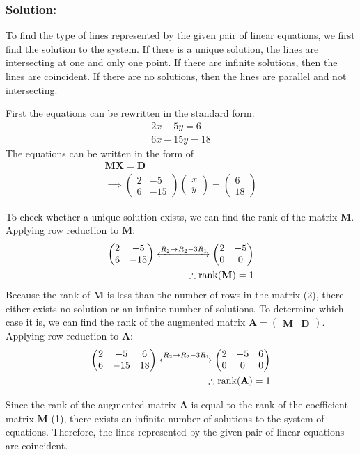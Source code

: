 \documentclass{beamer}
\newcommand{\myvec}[1]{\begin{pmatrix}#1\end{pmatrix}}
\newcommand{\rank}{\operatorname{rank}}
\renewcommand{\vec}[1]{\mathbf{#1}}
\begin{document}
\begin{frame}
    \frametitle{Solution: }
    To find the type of lines represented by the given pair of linear equations, we first find the solution to the system. If there is a unique solution, the lines are intersecting at one and only one point. If there are infinite solutions, then the lines are coincident. If there are no solutions, then the lines are parallel and not intersecting.

    First the equations can be rewritten in the standard form:
    \begin{align}
        2x - 5y = 6 \tag{1} \\
        6x - 15y = 18 \tag{2}
    \end{align}
    The equations can be written in the form of
    \begin{align}
        \vec{M}\vec{X} = \vec{D} \\
        \implies \myvec{2 & -5   \\ 6 & -15}\myvec{x \\ y} = \myvec{6 \\ 18}
    \end{align}
\end{frame}
\begin{frame}
    To check whether a unique solution exists, we can find the rank of the matrix $\vec{M}$.
    Applying row reduction to $\vec{M}$:
    \begin{align}
        \myvec{2 & -5 \\ 6 & -15} \xleftrightarrow{R_2 \rightarrow R_2 - 3R_1} \myvec{2 & -5 \\ 0 & 0}\\
        \therefore \rank(\vec{M}) = 1
    \end{align}
    Because the rank of $\vec{M}$ is less than the number of rows in the matrix (2), there either exists no solution or an infinite number of solutions. To determine which case it is, we can find the rank of the augmented matrix $\vec{A} = \myvec{\vec{M} & \vec{D}}$.
    Applying row reduction to $\vec{A}$:
    \begin{align}
        \myvec{2 & -5 & 6 \\ 6 & -15 & 18} \xleftrightarrow{R_2 \rightarrow R_2 - 3R_1} \myvec{2 & -5 & 6 \\ 0 & 0 & 0}\\
        \therefore \rank(\vec{A}) = 1
    \end{align}
\end{frame}
\begin{frame}
    Since the rank of the augmented matrix $\vec{A}$ is equal to the rank of the coefficient matrix $\vec{M}$ (1), there exists an infinite number of solutions to the system of equations. Therefore, the lines represented by the given pair of linear equations are coincident.
\end{frame}
\end{document}
